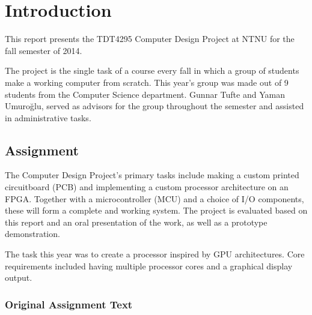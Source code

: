 \documentclass[../main/report.tex]{subfiles}
\begin{document}
\chapter{Introduction}
\label{sec:intro}

This report presents the TDT4295 Computer Design Project at NTNU for the fall semester of 2014.

The project is the single task of a course every fall in which a group of students make a working computer from scratch.
This year's group was made out of 9 students from the Computer Science department.
Gunnar Tufte and Yaman Umuroğlu, served as advisors for the group throughout the semester and assisted in administrative tasks.

\section{Assignment}

The Computer Design Project's primary tasks include making a custom printed circuitboard (PCB) and  implementing a custom processor architecture on an FPGA.
Together with a microcontroller (MCU) and a choice of I/O components, these will form a complete and working system.
The project is evaluated based on this report and an oral presentation of the work, as well as a prototype demonstration.

The task this year was to create a processor inspired by GPU architectures.
Core requirements included having multiple processor cores and a graphical display output.

\newpage

\subsection{Original Assignment Text}

\vspace{1cm}
\noindent
\end{document}
